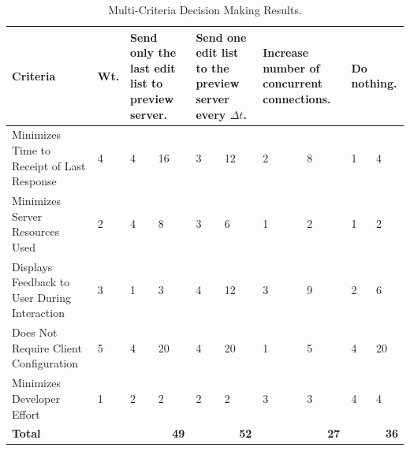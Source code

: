 \documentclass[se,resubmit]{uw-wkrpt}
\begin{document}
\begin{table}
  \caption{Multi-Criteria Decision Making Results.}
  \label{tbl:mcdm}
  \centering
  \begin{tabular}{|p{2.0cm}|p{1.0cm}|p{1.25cm}|p{1.25cm}|p{1.25cm}|p{1.25cm}|
                                     p{1.25cm}|p{1.25cm}|p{1.25cm}|p{1.25cm}|}
    \hline
    \textbf{Criteria} &
    \textbf{Wt.} &
    \multicolumn{2}{|p{2.5cm}|}{\textbf{Send only the last edit list to preview
    server.}} &
    \multicolumn{2}{|p{2.5cm}|}{\textbf{Send one edit list to the preview
    server every $\Delta t$.}} &
    \multicolumn{2}{|p{2.5cm}|}{\textbf{Increase number of concurrent
    connections.}} &
    \multicolumn{2}{|p{2.5cm}|}{\textbf{Do nothing.}} \\
    \hline\hline
    Minimizes Time to Receipt of Last Response &
       4 &  4 & 16 &  3 & 12 &  2 &  8 &  1 &  4 \\
    \hline
    Minimizes Server Resources Used &
       2 &  4 &  8 &  3 &  6 &  1 &  2 &  1 &  2 \\
    \hline
    Displays Feedback to User During Interaction &
       3 &  1 &  3 &  4 & 12 &  3 &  9 &  2 &  6 \\
    \hline
    Does Not Require Client Configuration &
       5 &  4 & 20 &  4 & 20 &  1 &  5 &  4 & 20 \\
    \hline
    Minimizes Developer Effort &
       1 &  2 &  2 &  2 &  2 &  3 &  3 &  4 &  4 \\
    \hline
    \hline
    \textbf{Total} &
      &
      \multicolumn{2}{|r|}{\textbf{49}} &
      \multicolumn{2}{|r|}{\textbf{52}} &
      \multicolumn{2}{|r|}{\textbf{27}} &
      \multicolumn{2}{|r|}{\textbf{36}} \\
    \hline
  \end{tabular}
\end{table}
\end{document}
